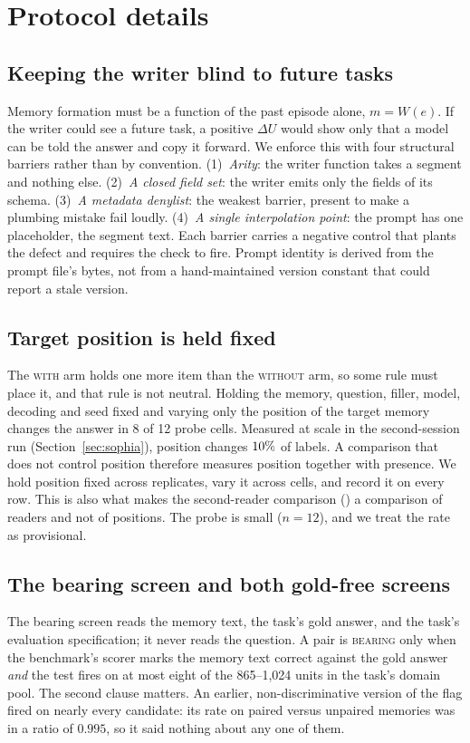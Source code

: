 \section{Protocol details}
\label{sec:protocol}

\subsection{Keeping the writer blind to future tasks}
\label{sec:taskblind}
Memory formation must be a function of the past episode alone, $m = W(e)$.
If the writer could see a future task, a positive $\Delta U$ would show only
that a model can be told the answer and copy it forward. We enforce this with
four structural barriers rather than by convention. (1)~\emph{Arity}: the
writer function takes a segment and nothing else. (2)~\emph{A closed field
set}: the writer emits only the fields of its schema. (3)~\emph{A metadata
denylist}: the weakest barrier, present to make a plumbing mistake fail loudly.
(4)~\emph{A single interpolation point}: the prompt has one placeholder, the
segment text. Each barrier carries a negative control that plants the defect
and requires the check to fire. Prompt identity is derived from the prompt
file's bytes, not from a hand-maintained version constant that could report a
stale version.

\subsection{Target position is held fixed}
\label{sec:position}
The \textsc{with} arm holds one more item than the \textsc{without} arm, so
some rule must place it, and that rule is not neutral. Holding the memory,
question, filler, model, decoding and seed fixed and varying only the
position of the target memory changes the answer in 8 of 12 probe cells. Measured at scale in the second-session
run (Section~\ref{sec:sophia}), position changes $10\%$ of labels. A
comparison that does not control position therefore measures position
together with presence. We hold position fixed across replicates, vary it
across cells, and record it on every row. This is also what makes the
second-reader comparison () a comparison of readers
and not of positions. The probe is small ($n{=}12$), and we treat the rate
as provisional.

\subsection{The bearing screen and both gold-free screens}
\label{sec:goldfree}
The bearing screen reads the memory text, the task's gold answer, and the
task's evaluation specification; it never reads the question. A pair is
\textsc{bearing} only when the benchmark's scorer marks the memory text
correct against the gold answer \emph{and} the test fires on at most eight of
the 865--1{,}024 units in the task's domain pool. The second clause matters.
An earlier, non-discriminative version of the flag fired on nearly every
candidate: its rate on paired versus unpaired memories was in a ratio of
$0.995$, so it said nothing about any one of them.

